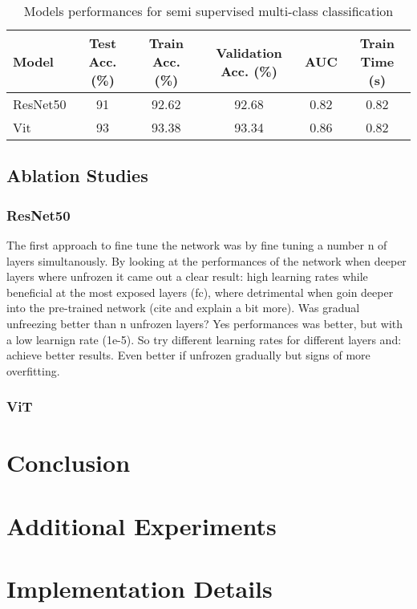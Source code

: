 \documentclass{article}
\begin{document}
\renewcommand{\arraystretch}{1.2} 
\begin{table}[h!] %
    \centering %
    \caption{Models performances for semi supervised multi-class classification} %
    \label{tab:semi_multi_perf} %
    \begin{tabular}{|l|c|c|c|c|c|}
        \hline
        Model & Test Acc. (\%) & Train Acc. (\%) & Validation Acc. (\%) & AUC & Train Time (s) \\
        \hline
        ResNet50 & 91 & 92.62 & 92.68 & 0.82 & 0.82 \\
        Vit & 93 & 93.38 & 93.34 & 0.86 & 0.82 \\
        \hline
    \end{tabular}
\end{table}

\subsection{Ablation Studies}


\subsubsection{ResNet50}
The first approach to fine tune the network was by fine tuning a number n of layers simultanously. By looking at the performances of the network when deeper layers where unfrozen it came out a clear result: high learning rates while beneficial at the most exposed layers (fc), where detrimental when goin deeper into the pre-trained network (cite and explain a bit more). Was gradual unfreezing better than n unfrozen layers? Yes performances was better, but with a low learnign rate (1e-5). So try different learning rates for different layers and: achieve better results. Even better if unfrozen gradually but signs of more overfitting.

\subsubsection{ViT}

\section{Conclusion}






\appendix
\section{Additional Experiments}


\section{Implementation Details}
\end{document}
